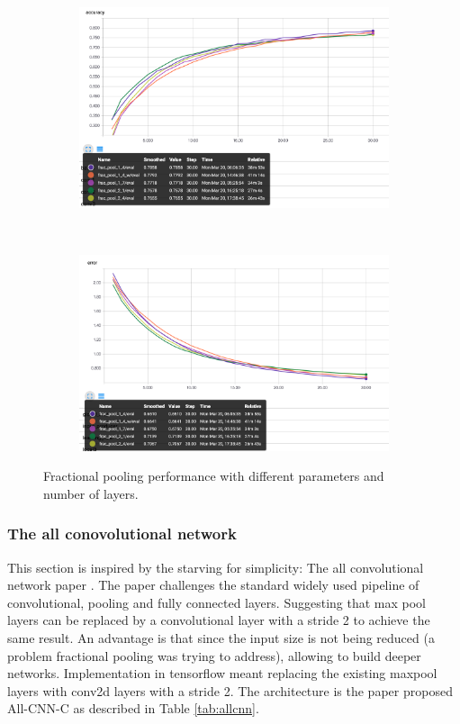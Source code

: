 \documentclass[12pt]{article}
\begin{document}
\begin{figure}[ht!]
    \centering
    \begin{subfigure}[t]{0.475\textwidth}
        \centering
        \includegraphics[width=1.0\linewidth]{fraca.png}
    \end{subfigure}%
    ~ 
    \begin{subfigure}[t]{0.475\textwidth}
        \centering
        \includegraphics[width=1.0\linewidth]{frace.png}
    \end{subfigure}
    \caption{Fractional pooling performance with different parameters and number of layers. }
    \label{fig:fracpool}
\end{figure}

\subsubsection*{The all conovolutional network}

This section is inspired by the starving for simplicity: The all convolutional network paper \cite{allconv}. The paper challenges the standard widely used pipeline of convolutional, pooling and fully connected layers. Suggesting that max pool layers can be replaced by a convolutional layer with a stride 2 to achieve the same result. An advantage is that since the input size is not being reduced (a problem fractional pooling was trying to address), allowing to build deeper networks. Implementation in tensorflow meant replacing the existing maxpool layers with conv2d layers with a stride 2. The architecture is the paper proposed All-CNN-C as described in Table \ref{tab:allcnn}. 
\end{document}
